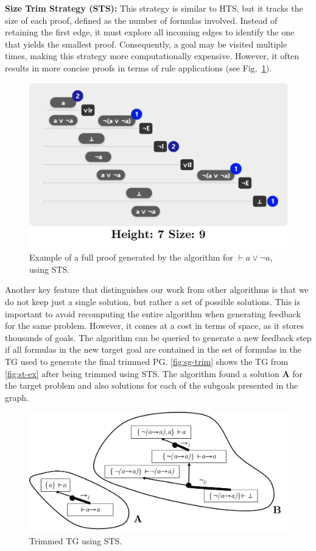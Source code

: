 \textbf{Size Trim Strategy (STS):} This strategy is similar to HTS, but it tracks the size of each proof, defined as the number of formulas involved. Instead of retaining the first edge, it must explore all incoming edges to identify the one that yields the smallest proof. Consequently, a goal may be visited multiple times, making this strategy more computationally expensive. However, it often results in more concise proofs in terms of rule applications (see Fig.~\ref{fig:sg-trim-size}).

\begin{figure}[t]
    \centering
    \includegraphics[width=0.6\linewidth]{resources/trim-size.jpg}
    \caption{Example of a full proof generated by the algorithm for \(\vdash a \vee \lnot a\), using STS.}
    \label{fig:sg-trim-size}
\end{figure}

Another key feature that distinguishes our work from other algorithms is that we do not keep just a single solution, but rather a set of possible solutions. This is important to avoid recomputing the entire algorithm when generating feedback for the same problem. However, it comes at a cost in terms of space, as it stores thousands of goals. The algorithm can be queried to generate a new feedback step if all formulas in the new target goal are contained in the set of formulas in the TG used to generate the final trimmed PG. \autoref{fig:sg-trim} shows the TG from \autoref{fig:st-ex} after being trimmed using STS. The algorithm found a solution \textbf{A} for the target problem and also solutions for each of the subgoals presented in the graph.
\begin{figure}[t]
    \centering
    \includegraphics[width=0.7\linewidth]{resources/sg-final.jpg}
    \caption{Trimmed TG using STS.}
    \label{fig:sg-trim}
\end{figure}
